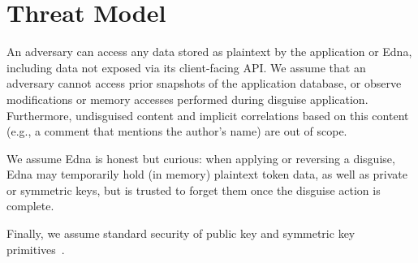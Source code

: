 
\section{Threat Model}
An adversary can access any data stored as plaintext by the application or Edna, including data not
exposed via its client-facing API. We assume that an adversary cannot access prior snapshots of the
application database, or observe modifications or memory accesses performed during disguise
application. Furthermore, undisguised content and implicit correlations based on this content (e.g.,
a comment that mentions the author’s name) are out of scope.

We assume Edna is honest but curious: when applying or reversing a disguise, Edna may temporarily
hold (in memory) plaintext token data, as well as private or symmetric keys, but is trusted to
forget them once the disguise action is complete.  

Finally, we assume standard security of public key and symmetric key primitives~.

